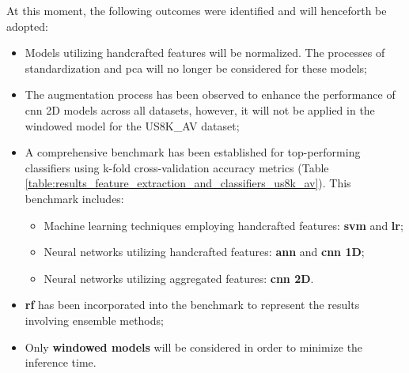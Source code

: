 At this moment, the following outcomes were identified and will henceforth be adopted:
\begin{itemize}
    \item Models utilizing handcrafted features will be normalized. The processes of standardization and \gls{pca} will no longer be considered for these models;
    \item The augmentation process has been observed to enhance the performance of \gls{cnn} 2D models across all datasets, however, it will not be applied in the windowed model for the US8K\_AV dataset;
    \item A comprehensive benchmark has been established for top-performing classifiers using k-fold cross-validation accuracy metrics (Table \ref{table:results_feature_extraction_and_classifiers_us8k_av}). This benchmark includes:
    \begin{itemize}
        \item Machine learning techniques employing handcrafted features: \textbf{\gls{svm}} and \textbf{\gls{lr}};
        \item Neural networks utilizing handcrafted features: \textbf{\gls{ann}} and \textbf{\gls{cnn} 1D};
        \item Neural networks utilizing aggregated features: \textbf{\gls{cnn} 2D}.
    \end{itemize}
    \item \textbf{\gls{rf}} has been incorporated into the benchmark to represent the results involving ensemble methods;
    \item Only \textbf{windowed models} will be considered in order to minimize the inference time.
\end{itemize}


